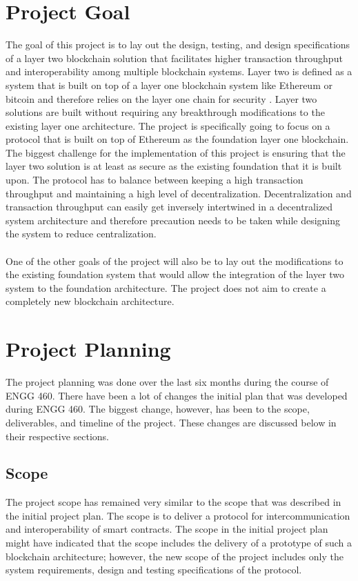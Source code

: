 \documentclass[a4paper,twoside,phd]{BYUPhys}
\begin{document}
\section{Project Goal}
The goal of this project is to lay out the design, testing, and design specifications of a layer two blockchain solution that facilitates higher transaction throughput and interoperability among multiple blockchain systems. Layer two is defined as a system that is built on top of a layer one blockchain system like Ethereum or bitcoin and therefore relies on the layer one chain for security \cite{MichaelJCaseyLayerCoinDesk}. Layer two solutions are built without requiring any breakthrough modifications to the existing layer one architecture\cite{MichaelJCaseyLayerCoinDesk}. The project is specifically going to focus on a protocol that is built on top of Ethereum as the foundation layer one blockchain. The biggest challenge for the implementation of this project is ensuring that the layer two solution is at least as secure as the existing foundation that it is built upon. The protocol has to balance between keeping a high transaction throughput and maintaining a high level of decentralization. Decentralization and transaction throughput can easily get inversely intertwined in a decentralized system architecture and therefore precaution needs to be taken while designing the system to reduce centralization.
\\
\\ One of the other goals of the project will also be to lay out the modifications to the existing foundation system that would allow the integration of the layer two system to the foundation architecture. The project does not aim to create a completely new blockchain architecture.
\section{Project Planning}
The project planning was done over the last six months during the course of ENGG 460. There have been a lot of changes the initial plan that was developed during ENGG 460. The biggest change, however, has been to the scope, deliverables, and timeline of the project. These changes are discussed below in their respective sections.

\subsection{Scope}
The project scope has remained very similar to the scope that was described in the initial project plan. The scope is to deliver a protocol for intercommunication and interoperability of smart contracts. The scope in the initial project plan might have indicated that the scope includes the delivery of a prototype of such a blockchain architecture; however, the new scope of the project includes only the system requirements, design and testing specifications of the protocol. 
\end{document}
